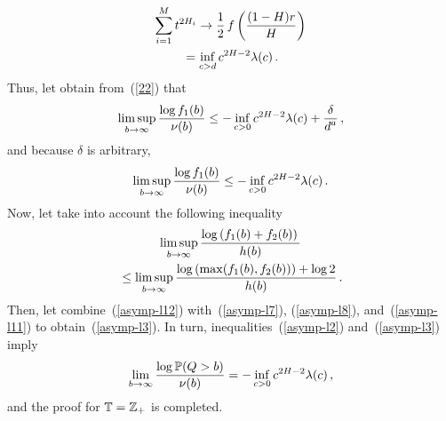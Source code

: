 \begin{multicols}{2}
\begin{multline}
 {\sum_{i=1}^M t^{2H_i}}\to
\displaystyle\frac{\displaystyle 1\mathstrut}{\displaystyle 2\mathstrut}\,f\left( \displaystyle\frac{\displaystyle (1-H)r\mathstrut}{\displaystyle H\mathstrut} \right)\\
{} =
\inf\limits_{c>d}c^{2H-2}\lambda(c)\,.
\end{multline}
Thus,  let obtain  from~(\ref{22})  that
\begin{equation*}
\limsup\limits_{b \to \infty}\displaystyle\frac{\displaystyle \log f_1(b)\mathstrut}{\displaystyle \nu(b)\mathstrut} \le - \inf\limits_{c>0}
c^{2H-2}\lambda(c)+\displaystyle\frac{\displaystyle \delta\mathstrut}{\displaystyle  d^{a}\mathstrut}\,,
\end{equation*}
and because $\delta$ is arbitrary,
\begin{equation}
\limsup\limits_{b \to \infty}\displaystyle\frac{\displaystyle \log f_1(b)\mathstrut}{\displaystyle \nu(b)\mathstrut} \leq -\inf\limits_{c>0}
c^{2H-2}\lambda(c)\,.
\label{asymp-l11}
\end{equation}
Now, let take  into account the following  inequality
\begin{multline}
\limsup\limits_{b \to \infty}\displaystyle\frac{\displaystyle \log \left(f_1(b)+f_2(b)\right)\mathstrut}{\displaystyle h(b)\mathstrut}\\
{}\leq \limsup\limits_{b \to \infty}\displaystyle\frac{\displaystyle  \log\left(\max(f_1(b),f_2(b))\right)+
\log 2\mathstrut}{\displaystyle h(b)\mathstrut}\,.
\label{asymp-l12}
\end{multline}
Then, let combine~(\ref{asymp-l12})  with~(\ref{asymp-l7}),
(\ref{asymp-l8}),  and~(\ref{asymp-l11}) to obtain~(\ref{asymp-l3}).
In turn, inequalities~(\ref{asymp-l2}) and~(\ref{asymp-l3})  imply
$$
\lim\limits_{b \to \infty}  \displaystyle\frac{\displaystyle \log \mathbb{P}
(Q>b)\mathstrut}{\displaystyle \nu(b)\mathstrut}=-\inf\limits_{c>0}c^{2H-2}\lambda(c)\,,
$$
and the proof for $\mathbb{T}=\mathbb{Z}_+$ is completed.


\smallskip


\end{multicols}
